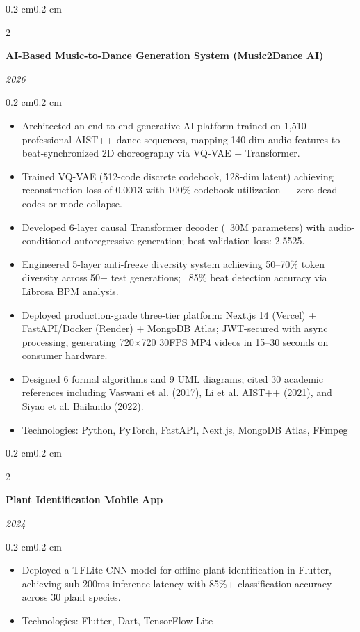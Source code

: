 \documentclass[10pt, a4paper]{article}
\newenvironment{highlights}{
    \begin{itemize}[
        topsep=0.10 cm,
        parsep=0.10 cm,
        partopsep=0pt,
        itemsep=0pt,
        leftmargin=0.4 cm + 10pt
    ]
}{\end{itemize}}
\newenvironment{onecolentry}{
    \begin{adjustwidth}{0.2 cm}{0.2 cm}
}{\end{adjustwidth}}
\newenvironment{twocolentry}[2][]{
    \onecolentry
    \def\secondColumn{#2}
    \setcolumnwidth{\fill, 4.5 cm}
    \begin{paracol}{2}
}{
    \switchcolumn \raggedleft \secondColumn
    \end{paracol}
    \endonecolentry
}
\begin{document}
\begin{twocolentry}{\textit{2026}}
    \textbf{ AI-Based Music-to-Dance Generation System (Music2Dance AI)}
\end{twocolentry}
\begin{onecolentry}
    \begin{highlights}
               

\item Architected an end-to-end generative AI platform trained on 1,510 professional AIST++
  dance sequences, mapping 140-dim audio features to beat-synchronized 2D choreography
  via VQ-VAE + Transformer.

\item Trained VQ-VAE (512-code discrete codebook, 128-dim latent) achieving reconstruction
  loss of 0.0013 with 100\% codebook utilization — zero dead codes or mode collapse.

\item Developed 6-layer causal Transformer decoder (~30M parameters) with audio-conditioned
  autoregressive generation; best validation loss: 2.5525.

\item Engineered 5-layer anti-freeze diversity system achieving 50–70\% token diversity across
  50+ test generations; ~85\% beat detection accuracy via Librosa BPM analysis.

\item Deployed production-grade three-tier platform: Next.js 14 (Vercel) + FastAPI/Docker
  (Render) + MongoDB Atlas; JWT-secured with async processing, generating 720×720
  30FPS MP4 videos in 15–30 seconds on consumer hardware.

\item Designed 6 formal algorithms and 9 UML diagrams; cited 30 academic references
  including Vaswani et al. (2017), Li et al. AIST++ (2021), and Siyao et al. Bailando (2022).
\item Technologies: Python, PyTorch, FastAPI, Next.js, MongoDB Atlas, FFmpeg
    \end{highlights}
\end{onecolentry}
\begin{twocolentry}{\textit{2024}}
    \textbf{Plant Identification Mobile App}
\end{twocolentry}

\begin{onecolentry}
    \begin{highlights}
        \item Deployed a TFLite CNN model for offline plant identification in Flutter, achieving sub-200ms inference latency with 85\%+ classification accuracy across 30 plant species.
        \item Technologies: Flutter, Dart, TensorFlow Lite
    \end{highlights}
\end{onecolentry}
\end{document}
